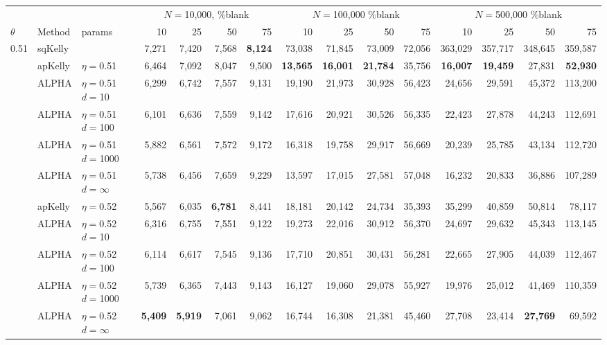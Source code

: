 \documentclass[12pt,runningheads]{llncs}
\begin{document}
{\begin{table}
\tiny
\begin{tabular}{lll|rrrr|rrrr|rrrr} 
& & & \multicolumn{4}{|c|}{$N=$10,000, \%blank} &  \multicolumn{4}{|c|}{$N=$100,000 \%blank} & \multicolumn{4}{|c}{$N=$500,000 \%blank} \\ 
$\theta$ & Method & params & 10 & 25 & 50 & 75  & 10 & 25 & 50 & 75  & 10 & 25 & 50 & 75  \\
\hline 0.51 & sqKelly & & 7,271  & 7,420  & 7,568  & \bf{8,124}  & 73,038  & 71,845  & 73,009  & 72,056  & 363,029  & 357,717  & 348,645  & 359,587  \\
\cline{2-15} & apKelly & $\eta=$0.51 & 6,464  & 7,092  & 8,047  & 9,500  & \bf{13,565}  & \bf{16,001}  & \bf{21,784}  & 35,756  & \bf{16,007}  & \bf{19,459}  & 27,831  & \bf{52,930}  \\
& ALPHA & $\eta=$0.51 $d=$10 & 6,299  & 6,742  & 7,557  & 9,131  & 19,190  & 21,973  & 30,928  & 56,423  & 24,656  & 29,591  & 45,372  & 113,200  \\
& ALPHA & $\eta=$0.51 $d=$100 & 6,101  & 6,636  & 7,559  & 9,142  & 17,616  & 20,921  & 30,526  & 56,335  & 22,423  & 27,878  & 44,243  & 112,691  \\
& ALPHA & $\eta=$0.51 $d=$1000 & 5,882  & 6,561  & 7,572  & 9,172  & 16,318  & 19,758  & 29,917  & 56,669  & 20,239  & 25,785  & 43,134  & 112,720  \\
 & ALPHA & $\eta=$0.51 $d=\infty$ & 5,738  & 6,456  & 7,659  & 9,229  & 13,597  & 17,015  & 27,581  & 57,048  & 16,232  & 20,833  & 36,886  & 107,289  \\
\cline{2-15} & apKelly & $\eta=$0.52 & 5,567  & 6,035  & \bf{6,781}  & 8,441  & 18,181  & 20,142  & 24,734  & 35,393  & 35,299  & 40,859  & 50,814  & 78,117  \\
& ALPHA & $\eta=$0.52 $d=$10 & 6,316  & 6,755  & 7,551  & 9,122  & 19,273  & 22,016  & 30,912  & 56,370  & 24,697  & 29,632  & 45,343  & 113,145  \\
& ALPHA & $\eta=$0.52 $d=$100 & 6,114  & 6,617  & 7,545  & 9,136  & 17,710  & 20,851  & 30,431  & 56,281  & 22,665  & 27,905  & 44,039  & 112,467  \\
& ALPHA & $\eta=$0.52 $d=$1000 & 5,739  & 6,365  & 7,443  & 9,143  & 16,127  & 19,060  & 29,078  & 55,927  & 19,976  & 25,012  & 41,469  & 110,359  \\
 & ALPHA & $\eta=$0.52 $d=\infty$ & \bf{5,409}  & \bf{5,919}  & 7,061  & 9,062  & 16,744  & 16,308  & 21,381  & 45,460  & 27,708  & 23,414  & \bf{27,769}  & 69,592  \\

\end{tabular}
\end{table}}
\end{document}
